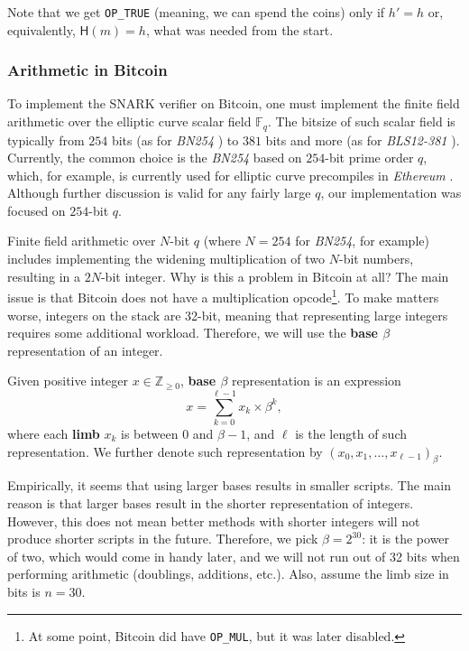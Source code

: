 \documentclass{iacrtrans}
\begin{document}
Note that we get \texttt{OP\_TRUE} (meaning, we can spend the coins) only if $h'=h$ or, equivalently, $\mathsf{H}(m)=h$, what was needed from the start.

\subsubsection{Arithmetic in Bitcoin}\label{section:arithmetic_bitcoin}

To implement the SNARK verifier on Bitcoin, one must implement the finite field arithmetic over the elliptic curve scalar field $\mathbb{F}_q$. The bitsize of such scalar field is typically from $254$ bits (as for \textit{BN254} \cite{bn254}) to $381$ bits and more (as for \textit{BLS12-381} \cite{bls12}). Currently, the common choice is the \textit{BN254} based on $254$-bit prime order $q$, which, for example, is currently used for elliptic curve precompiles in \textit{Ethereum} \cite{ethereum}. Although further discussion is valid for any fairly large $q$, our implementation was focused on $254$-bit $q$. 

Finite field arithmetic over $N$-bit $q$ (where $N=254$ for \textit{BN254}, for example) includes implementing the widening multiplication of two $N$-bit numbers, resulting in a $2N$-bit integer. Why is this a problem in Bitcoin at all? The main issue is that Bitcoin does not have a multiplication opcode\footnote{At some point, Bitcoin did have \texttt{OP\_MUL}, but it was later disabled.}. To make matters worse, integers on the stack are 32-bit, meaning that representing large integers requires some additional workload. Therefore, we will use the \textbf{base $\beta$} representation of an integer.

\begin{definition}
    Given positive integer $x \in \mathbb{Z}_{\geq 0}$, \textbf{base $\beta$} representation is an expression
    \begin{equation}
        x = \sum_{k=0}^{\ell-1}x_k \times\beta^k,
    \end{equation}
    where each \textbf{limb} $x_k$ is between $0$ and $\beta-1$, and $\ell$ is the length of such representation. We further denote such representation by $(x_0,x_1,\dots,x_{\ell-1})_{\beta}$. 
\end{definition}

Empirically, it seems that using larger bases results in smaller scripts. The main reason is that larger bases result in the shorter representation of integers. However, this does not mean better methods with shorter integers will not produce shorter scripts in the future. Therefore, we pick $\beta=2^{30}$: it is the power of two, which would come in handy later, and we will not run out of 32 bits when performing arithmetic (doublings, additions, etc.). Also, assume the limb size in bits is $n=30$.
\end{document}
